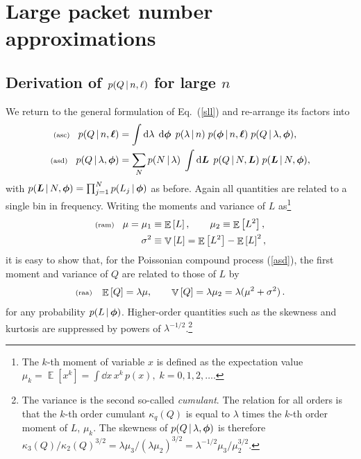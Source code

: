 \documentclass[11pt]{article}
\newcommand{\fredmargin}[1]{\todo[color=orange!40]{#1}} %
\newcommand{\lleq}[1]{\label{#1} }
\renewcommand{\lleq}[1]{\label{#1} {\scriptstyle {\rm (#1)}} \hspace*{2ex} }
\newcommand{\cond}{\,|\,}
\newcommand{\refeq}[1]{Eq.~(\ref{#1})}
\DeclareMathOperator{\Expect}{\mathbb{E}}
\newcommand{\expect}[1]{\Expect\left[#1\right]}
\newcommand{\Lum}{L}
\newcommand{\rmdx}[1]{\dd{#1}} %
\DeclareMathOperator{\Variance}{\mathbb{V}}
\newcommand{\variance}[1]{\Variance\left[#1\right]}
\begin{document}
\section{Large packet number approximations} \label{sec:asymptotic}

\subsection{Derivation of $p(Q\,|\,n,\boldmath{\ell})$ for large $n$}

We return to the general formulation of \refeq{sll} and re-arrange its
factors into
\begin{align}
  \lleq{asc}
  p(Q\cond n,\bml)
  &= \int \rmdx{\lambda}\; \rmdx{\bmphi}\;
    p(\lambda\cond n)\;
    p(\bmphi\cond n,\bml)\;
    p(Q\cond \lambda,\bmphi), \\
  \lleq{asd}
  p(Q\cond \lambda,\bmphi)
  &= \sum_N
    p(N\cond \lambda)\;
    \int \rmdx{\bmL}\;
    p(Q\cond N,\bmL)\;
    p(\bmL\cond N,\bmphi),
\end{align}
with $p(\bmL\cond N,\bmphi) = \prod_{j=1}^N p(L_j\cond\bmphi)$ as
before. Again all quantities are related to a single bin in frequency.
Writing the moments and variance of $L$ as\footnote{The $k$-th moment
  of variable $x$ is defined as the expectation value $\mu_k =
  \expect{x^k} = \int \rmdx{x}\,x^k\,p(x),\; k = 0,1,2,\ldots$.} %
\begin{align}
  \lleq{ram}
  \mu =  \mu_1 &\equiv \expect{\Lum}, \qquad
  \mu_2 \equiv \expect{\Lum^2}, \\
  \sigma^2 &\equiv \variance{\Lum}
  = \expect{\Lum^2} - \expect{\Lum}^2,
\end{align}
it is easy to show that, for the Poissonian compound process
(\ref{asd}), the first moment and variance of $Q$ are related to those
of $L$ by
\fredmargin{citation} %
\begin{align}
  \lleq{raa}
  \expect{Q} = \lambda \mu, \qquad
  \variance{Q} = \lambda \mu_2 = \lambda (\mu^2 + \sigma^2) \,.
\end{align}
for any probability $p(L\cond\bmphi)$.
%
Higher-order quantities such as the skewness and kurtosis are
suppressed by powers of $\lambda^{-1/2}$.\footnote{ The variance is
  the second so-called \textit{cumulant}. The relation for all orders
  is that the $k$-th order cumulant $\kappa_q(Q)$ is equal to
  $\lambda$ times the $k$-th order moment of $L$, $\mu_k$. The
  skewness of $p(Q\cond \lambda,\bmphi)$ is therefore
  $\kappa_3(Q)/\kappa_2(Q)^{3/2} = \lambda \mu_3/(\lambda \mu_2)^{3/2}
  = \lambda^{-1/2} \mu_3/\mu_2^{3/2}$.}  %
\end{document}
